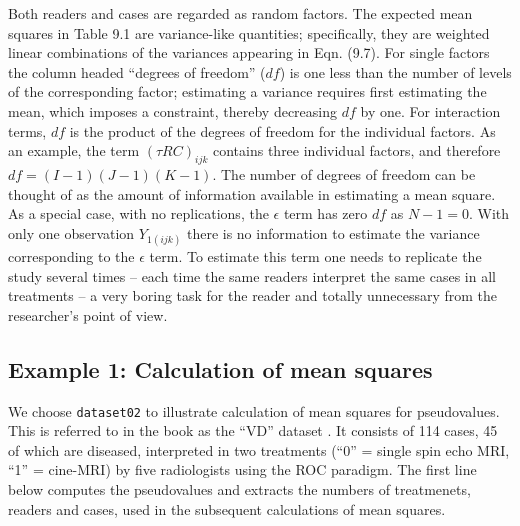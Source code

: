 \documentclass[
]{book}
\begin{document}
Both readers and cases are regarded as random factors. The expected mean squares in Table 9.1 are variance-like quantities; specifically, they are weighted linear combinations of the variances appearing in Eqn. (9.7). For single factors the column headed ``degrees of freedom'' (\(df\)) is one less than the number of levels of the corresponding factor; estimating a variance requires first estimating the mean, which imposes a constraint, thereby decreasing \(df\) by one. For interaction terms, \(df\) is the product of the degrees of freedom for the individual factors. As an example, the term \((\tau RC)_{ijk}\) contains three individual factors, and therefore \(df = (I-1)(J-1)(K-1)\). The number of degrees of freedom can be thought of as the amount of information available in estimating a mean square. As a special case, with no replications, the \(\epsilon\) term has zero \(df\) as \(N-1 = 0\). With only one observation \(Y_{1(ijk)}\) there is no information to estimate the variance corresponding to the \(\epsilon\) term. To estimate this term one needs to replicate the study several times -- each time the same readers interpret the same cases in all treatments -- a very boring task for the reader and totally unnecessary from the researcher's point of view.

\hypertarget{example-1-calculation-of-mean-squares}{%
\subsection{Example 1: Calculation of mean squares}\label{example-1-calculation-of-mean-squares}}

We choose \texttt{dataset02} to illustrate calculation of mean squares for pseudovalues. This is referred to in the book as the ``VD'' dataset \citep{RN1993}. It consists of 114 cases, 45 of which are diseased, interpreted in two treatments (``0'' = single spin echo MRI, ``1'' = cine-MRI) by five radiologists using the ROC paradigm. The first line below computes the pseudovalues and extracts the numbers of treatmenets, readers and cases, used in the subsequent calculations of mean squares.
\end{document}
